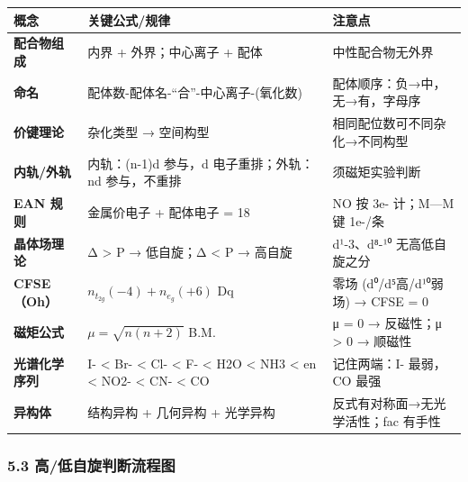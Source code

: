 \documentclass[a4paper,11pt]{ctexart}
\newcounter{none}
\begin{document}
{\def\LTcaptype{none} %
\begin{longtable}[]{@{}
  >{\raggedright\arraybackslash}p{}
  >{\raggedright\arraybackslash}p{}
  >{\raggedright\arraybackslash}p{}@{}}
\toprule\noalign{}
\begin{minipage}[b]{\linewidth}\raggedright
概念
\end{minipage} & \begin{minipage}[b]{\linewidth}\raggedright
关键公式/规律
\end{minipage} & \begin{minipage}[b]{\linewidth}\raggedright
注意点
\end{minipage} \\
\midrule\noalign{}
\endhead
\bottomrule\noalign{}
\endlastfoot
\textbf{配合物组成} & 内界 + 外界；中心离子 + 配体 & 中性配合物无外界 \\
\textbf{命名} & 配体数-配体名-``合''-中心离子-(氧化数) & 配体顺序：负→中，无→有，字母序 \\
\textbf{价键理论} & 杂化类型 → 空间构型 & 相同配位数可不同杂化→不同构型 \\
\textbf{内轨/外轨} & 内轨：(n-1)d 参与，d 电子重排；外轨：nd 参与，不重排 & 须磁矩实验判断 \\
\textbf{EAN 规则} & 金属价电子 + 配体电子 = 18 & NO 按 3e- 计；M---M 键 1e-/条 \\
\textbf{晶体场理论} & Δ \textgreater{} P → 低自旋；Δ \textless{} P → 高自旋 & d¹-3、d⁸-¹⁰ 无高低自旋之分 \\
\textbf{CFSE（Oh）} & \(n_{t_{2g}}(-4) + n_{e_g}(+6)\) Dq & 零场 (d⁰/d⁵高/d¹⁰弱场) → CFSE = 0 \\
\textbf{磁矩公式} & \(\mu = \sqrt{n(n+2)}\) B.M. & μ = 0 → 反磁性；μ \textgreater{} 0 → 顺磁性 \\
\textbf{光谱化学序列} & I- \textless{} Br- \textless{} Cl- \textless{} F- \textless{} H2O \textless{} NH3 \textless{} en \textless{} NO2- \textless{} CN- \textless{} CO & 记住两端：I- 最弱，CO 最强 \\
\textbf{异构体} & 结构异构 + 几何异构 + 光学异构 & 反式有对称面→无光学活性；fac 有手性 \\
\end{longtable}
}

\subsubsection{5.3 高/低自旋判断流程图}\label{ux9ad8ux4f4eux81eaux65cbux5224ux65adux6d41ux7a0bux56fe}
\end{document}
